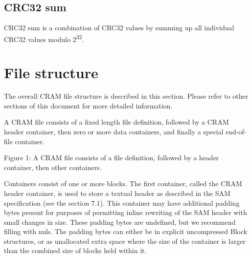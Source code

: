 \documentclass[a4paper]{article}
\begin{document}
\subsection{\textbf{CRC32 sum}}
CRC32 sum is a combination of CRC32 values by summing up all individual CRC32 values modulo 2\textsuperscript{32}. 

\section{\textbf{File structure}}

The overall CRAM file structure is described in this section. Please refer to other 
sections of this document for more detailed information. 

A CRAM file consists of a fixed length file definition, followed by a CRAM header container,
then zero or more data containers, and finally a special end-of-file container.

\begin{center}

Figure 1: A CRAM file consists of a file definition, followed by a header container, then other containers.
\end{center}

Containers consist of one or more blocks. The first container, called the CRAM header container,
is used to store a textual header as described in the SAM specification (see the section 7.1).
This container may have additional padding bytes present for purposes
of permitting inline rewriting of the SAM header with small changes in
size. These padding bytes are undefined, but we recommend filling with
nuls.  The padding bytes can either be in explicit uncompressed Block
structures, or as unallocated extra space where the size of the
container is larger than the combined size of blocks held within it.
\end{document}
